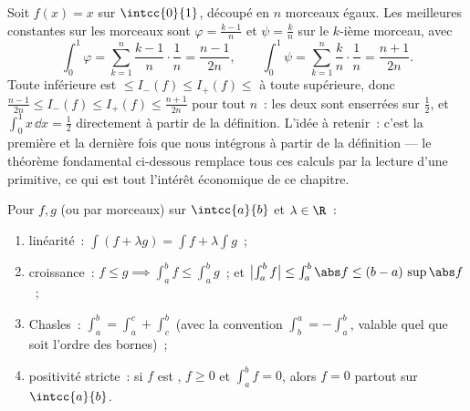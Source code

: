 \begin{example}\label{ex:b1:integration:defcompute}
Soit $f(x) = x$ sur $\intcc{0}{1}$, découpé en $n$ morceaux
égaux. Les meilleures  constantes sur les
morceaux sont $\varphi = \frac{k-1}{n}$ et $\psi = \frac kn$ sur
le $k$-ième morceau, avec
\[
\int_0^1 \varphi = \sum_{k=1}^{n} \frac{k-1}{n}\cdot\frac1n
= \frac{n-1}{2n},
\qquad
\int_0^1 \psi = \sum_{k=1}^{n} \frac{k}{n}\cdot\frac1n
= \frac{n+1}{2n} .
\]
Toute  inférieure est $\leq I_-(f) \leq I_+(f) \leq$ à
toute  supérieure, donc $\frac{n-1}{2n} \leq I_-(f) \leq
I_+(f) \leq \frac{n+1}{2n}$ pour tout $n$~: les deux sont
enserrées sur $\frac12$, et $\int_0^1 x\,\dd x = \frac12$
directement à partir de la définition. L'idée à retenir~: c'est la
première et la dernière fois que nous intégrons à partir de la
définition --- le théorème fondamental ci-dessous remplace tous
ces calculs par la lecture d'une primitive, ce qui est tout
l'intérêt économique de ce chapitre.
\end{example}

\begin{theorem}[Propriétés]\label{thm:b1:integration:props}
Pour $f, g$  (ou  par morceaux) sur $\intcc{a}{b}$
et $\lambda \in \R$~:
\begin{enumerate}
  \item linéarité~: $\int (f + \lambda g) = \int f + \lambda \int g$~;
  \item croissance~: $f \leq g \implies \int_a^b f \leq \int_a^b g$~;
        et $\bigl|\int_a^b f\bigr| \leq \int_a^b \abs f \leq (b -
        a)\, \sup\abs f$~;
  \item Chasles~: $\int_a^b = \int_a^c + \int_c^b$ (avec la
        convention $\int_b^a = -\int_a^b$, valable quel que soit
        l'ordre des bornes)~;
  \item positivité stricte~: si $f$ est , $f \geq 0$ et
        $\int_a^b f = 0$, alors $f = 0$ partout sur
        $\intcc{a}{b}$.
\end{enumerate}
\end{theorem}

